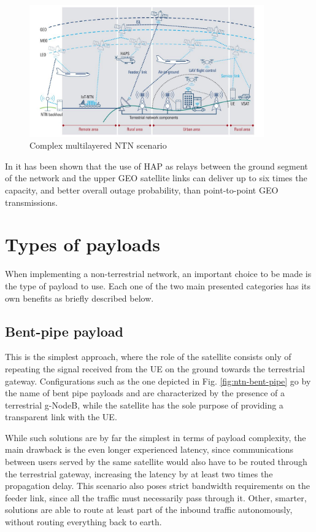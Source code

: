 \begin{figure}[ht]
    \centering
    \includegraphics[width=0.9\textwidth]{res/multilayered-ntn.jpg}
    \caption{Complex multilayered \ac{NTN} scenario \cite{connecting-ntn-rohde-schwarz}}
    \label{fig:multilayered-ntn}
\end{figure}

In \cite{potential-multilayered-nierarchical-ntn-wang} it has been shown that the use of \ac{HAP} as relays between the ground segment of the network and the upper \ac{GEO} satellite links can deliver up to six times the capacity, and better overall outage probability, than point-to-point \ac{GEO} transmissions.


\section{Types of payloads}
When implementing a non-terrestrial network, an important choice to be made is the type of payload to use. Each one of the two main presented categories has its own benefits as briefly described below.

\subsection{Bent-pipe payload}
\label{sec:bent-pipe-payload}
This is the simplest approach, where the role of the satellite consists only of  repeating the signal received from the \ac{UE} on the ground towards the terrestrial gateway. Configurations such as the one depicted in Fig. \ref{fig:ntn-bent-pipe} go by the name of bent pipe payloads and are characterized by the presence of a terrestrial g-NodeB, while the satellite has the sole purpose of providing a transparent link with the \ac{UE}.

While such solutions are by far the simplest in terms of payload complexity, the main drawback is the even longer experienced latency, since communications between users served by the same satellite would also have to be routed through the terrestrial gateway, increasing the latency by at least two times the propagation delay.
This scenario also poses strict bandwidth requirements on the feeder link, since all the traffic must necessarily pass through it.
Other, smarter, solutions are able to route at least part of the inbound traffic autonomously, without routing everything back to earth.

